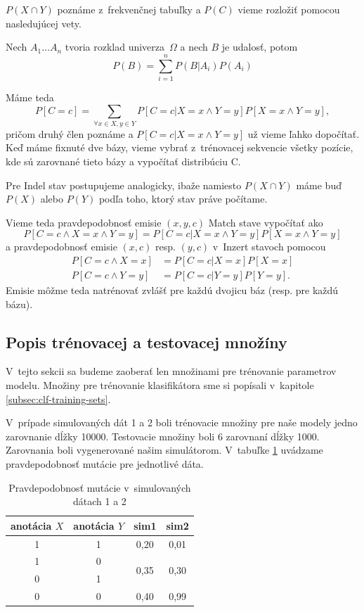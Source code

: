 $P(X \cap Y)$ poznáme z~frekvenčnej tabuľky a $P(C)$ vieme rozložiť pomocou nasledujúcej vety.

\begin{vt}
Nech $A_1\dots A_n$ tvoria rozklad univerza~$\Omega$ a nech $B$ je udalosť, potom
$$P(B) = \sum_{i=1}^n P(B|A_i)P(A_i)$$
\end{vt}

Máme teda
$$P\left[C=c\right] = \sum_{\forall x\in X, y \in Y} P\left[C=c | X=x \wedge Y=y\right] P\left[X=x \wedge Y=y\right],$$
pričom druhý člen poznáme a $P\left[C=c | X=x \wedge Y=y\right]$ už vieme ľahko dopočítať. Keď máme fixnuté dve bázy, vieme vybrať z~trénovacej sekvencie všetky pozície, kde sú zarovnané tieto bázy a vypočítať distribúciu C.

Pre Indel stav postupujeme analogicky, ibaže namiesto $P(X \cap Y)$ máme buď $P(X)$ alebo $P(Y)$ podľa toho, ktorý stav práve počítame.

Vieme teda pravdepodobnosť emisie $(x, y, c)$ Match stave vypočítať ako $$P\left[C=c \wedge X=x \wedge Y=y\right] = P\left[C=c | X=x \wedge Y=y\right] P\left[X=x \wedge Y=y\right]$$ a pravdepodobnosť emisie $(x, c)$ resp. $(y, c)$  v~Inzert stavoch pomocou
\begin{align*}
P\left[C=c \wedge X=x\right] &= P\left[C=c | X=x\right] P\left[X=x\right]\\
P\left[C=c \wedge Y=y\right] &= P\left[C=c | Y=y\right] P\left[Y=y\right].
\end{align*}
Emisie môžme teda natrénovať zvlášť pre každú dvojicu báz (resp. pre každú bázu).

\subsection{Popis trénovacej a testovacej množíny}

V~tejto sekcii sa budeme zaoberať len množinami pre trénovanie parametrov modelu. Množiny pre trénovanie klasifikátora sme si popísali v~kapitole \ref{subsec:clf-training-sets}.

V~prípade simulovaných dát 1 a 2 boli trénovacie množiny pre naše modely jedno zarovnanie dĺžky 10000. Testovacie množiny boli 6 zarovnaní dĺžky 1000. Zarovnania boli vygenerované našim simulátorom. V~tabuľke \ref{tab:sim-params} uvádzame pravdepodobnosť mutácie pre jednotlivé dáta.

\begin{table}
\centering
\begin{tabular}{cccc}
\toprule
anotácia $X$ & anotácia $Y$ & sim1 & sim2\\
\midrule
1 & 1 & 0,20 & 0,01\\
1 & 0 & \multirow{2}{*}{0,35} & \multirow{2}{*}{0,30}\\
0 & 1\\
0 & 0 & 0,40 & 0,99\\
\bottomrule
\end{tabular}
\caption[Pravdepodobnosť mutácie v~našich datasetoch]{Pravdepodobnosť mutácie v~simulovaných dátach 1 a 2}
\label{tab:sim-params}
\end{table}

